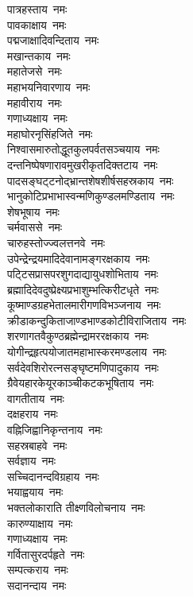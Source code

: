 \begin{flushleft}
पात्रहस्ताय~नमः\\
पावकाक्षाय~नमः\\
पद्मजाक्षादिवन्दिताय~नमः\\
मखान्तकाय~नमः\\
महातेजसे~नमः\\
महाभयनिवारणाय~नमः\\
महावीराय~नमः\\
गणाध्यक्षाय~नमः\\
महाघोरनृसिंहजिते~नमः\\
निश्वासमारुतोद्धूतकुलपर्वतसञ्चयाय~नमः\hfill{}\\
दन्तनिष्पेषणारावमुखरीकृतदिक्तटाय~नमः\\
पादसङ्घट्‍टनोद्भ्रान्तशेषशीर्षसहस्रकाय~नमः\\
भानुकोटिप्रभाभास्वन्मणिकुण्डलमण्डिताय~नमः\\
शेषभूषाय~नमः\\
चर्मवाससे~नमः\\
चारुहस्तोज्ज्वलत्तनवे~नमः\\
उपेन्द्रेन्द्रयमादिदेवानामङ्गरक्षकाय~नमः\\
पट्‍टिसप्रासपरशुगदाद्यायुधशोभिताय~नमः\\
ब्रह्मादिदेवदुष्प्रेक्ष्यप्रभाशुम्भत्किरीटधृते~नमः\\
कूष्माण्डग्रहभेतालमारीगणविभञ्जनाय~नमः\hfill{}\\
क्रीडाकन्दुकिताजाण्डभाण्डकोटीविराजिताय~नमः\\
शरणागतवैकुण्ठब्रह्मेन्द्रामररक्षकाय~नमः\\
योगीन्द्रहृत्पयोजातमहाभास्करमण्डलाय~नमः\\
सर्वदेवशिरोरत्नसङ्घृष्टमणिपादुकाय~नमः\\
ग्रैवेयहारकेयूरकाञ्चीकटकभूषिताय~नमः\\
वागतीताय~नमः\\
दक्षहराय~नमः\\
वह्निजिह्वानिकृन्तनाय~नमः\\
सहस्रबाहवे~नमः\\
सर्वज्ञाय~नमः\hfill{}\\
सच्चिदानन्दविग्रहाय~नमः\\
भयाह्वयाय~नमः\\
भक्तलोकाराति तीक्ष्णविलोचनाय~नमः\\
कारुण्याक्षाय~नमः\\
गणाध्यक्षाय~नमः\\
गर्वितासुरदर्पहृते~नमः\\
सम्पत्कराय~नमः\\
सदानन्दाय~नमः\\

\end{flushleft}
